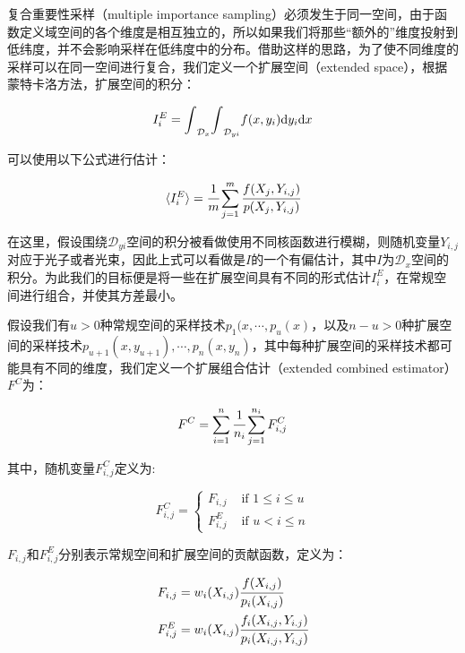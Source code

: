 复合重要性采样（multiple importance sampling）必须发生于同一空间，由于函数定义域空间的各个维度是相互独立的，所以如果我们将那些“额外的”维度投射到低纬度，并不会影响采样在低纬度中的分布。借助这样的思路，为了使不同维度的采样可以在同一空间进行复合，我们定义一个扩展空间（extended space），根据蒙特卡洛方法，扩展空间的积分：

\begin{equation}
	I^{E}_i={\rm \int}_{\mathcal{D}_x}{\rm \int}_{\mathcal{D}_{yi}}f(x,y_i){\rm d}y_i{\rm d}x	
\end{equation}

\noindent 可以使用以下公式进行估计：

\begin{equation}
	\langle I^{E}_i\rangle= \cfrac{1}{m}\sum^{m}_{j=1} \cfrac{f(X_j,Y_{i,j})}{p(X_j,Y_{i,j})}
\end{equation}

在这里，假设围绕$\mathcal{D}_{yi}$空间的积分被看做使用不同核函数进行模糊，则随机变量$Y_{i,j}$对应于光子或者光束，因此上式可以看做是$I$的一个有偏估计，其中$I$为$\mathcal{D}_x$空间的积分。为此我们的目标便是将一些在扩展空间具有不同的形式估计$I^{E}_i$，在常规空间进行组合，并使其方差最小。

假设我们有$u>0$种常规空间的采样技术$p_1(x,\cdots,p_u(x)$，以及$n-u>0$种扩展空间的采样技术$p_{u+1}(x,y_{u+1}),\cdots,p_n(x,y_n)$，其中每种扩展空间的采样技术都可能具有不同的维度，我们定义一个扩展组合估计（extended combined estimator）$F^{C}$为：

\begin{equation}\label{e:pm-extended-combined-estimator}
	F^{C}=\sum^{n}_{i=1} \cfrac{1}{n_i}\sum^{n_i}_{j=1}F^{C}_{i,j}
\end{equation}

\noindent 其中，随机变量$F^{C}_{i,j}$定义为:

\begin{equation}
	F^{C}_{i,j}=\begin{cases}
		F_{i,j} & \text{ if } 1\leq i\leq u\\
		F^{E}_{i,j}& \text{ if } u< i\leq n
	\end{cases}
\end{equation}

\noindent $F_{i,j}$和$F^{E}_{i,j}$分别表示常规空间和扩展空间的贡献函数，定义为：

\begin{equation}
	\begin{aligned}
		F_{i,j}&=w_i(X_{i,j}) \cfrac{f(X_{i,j})}{p_i(X_{i,j})}\\
		F^{E}_{i,j}&=w_i(X_{i,j}) \cfrac{f_i(X_{i,j},Y_{i.j})}{p_i(X_{i,j},Y_{i,j})}
	\end{aligned}
\end{equation}

